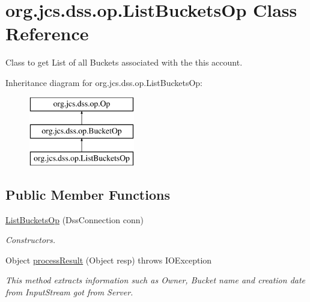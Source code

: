 \hypertarget{classorg_1_1jcs_1_1dss_1_1op_1_1ListBucketsOp}{}\section{org.\+jcs.\+dss.\+op.\+List\+Buckets\+Op Class Reference}
\label{classorg_1_1jcs_1_1dss_1_1op_1_1ListBucketsOp}


Class to get List of all Buckets associated with the this account.  


Inheritance diagram for org.\+jcs.\+dss.\+op.\+List\+Buckets\+Op\+:\begin{figure}[H]
\begin{center}
\leavevmode
\includegraphics[height=3.000000cm]{classorg_1_1jcs_1_1dss_1_1op_1_1ListBucketsOp}
\end{center}
\end{figure}
\subsection*{Public Member Functions}
\begin{DoxyCompactItemize}
\item 
\hyperlink{classorg_1_1jcs_1_1dss_1_1op_1_1ListBucketsOp_a753f4dede03a1bdf70af02b6353a7f24}{List\+Buckets\+Op} (Dss\+Connection conn)\hypertarget{classorg_1_1jcs_1_1dss_1_1op_1_1ListBucketsOp_a753f4dede03a1bdf70af02b6353a7f24}{}\label{classorg_1_1jcs_1_1dss_1_1op_1_1ListBucketsOp_a753f4dede03a1bdf70af02b6353a7f24}

\begin{DoxyCompactList}\small\item\em Constructors. \end{DoxyCompactList}\item 
Object \hyperlink{classorg_1_1jcs_1_1dss_1_1op_1_1ListBucketsOp_abe4f8f93c6a8da17a4e56915de1445f7}{process\+Result} (Object resp)  throws I\+O\+Exception
\begin{DoxyCompactList}\small\item\em This method extracts information such as Owner, Bucket name and creation date from Input\+Stream got from Server. \end{DoxyCompactList}\end{DoxyCompactItemize}
